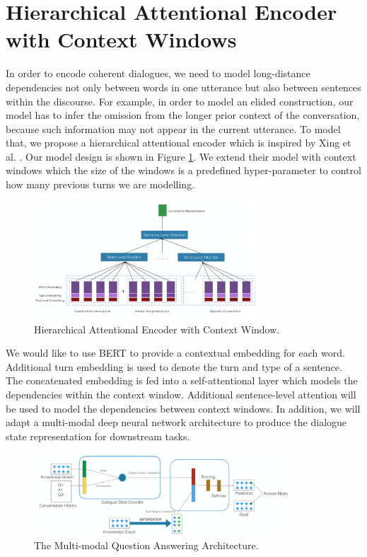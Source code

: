 \documentclass[bsc,frontabs,twoside,singlespacing,parskip,deptreport]{infthesis}     %
\begin{document}
\section{Hierarchical Attentional Encoder with Context Windows}

In order to encode coherent dialogues, we need to model long-distance dependencies not only between words in one utterance but also between sentences within the discourse. For example, in order to model an elided construction, our model has to infer the omission from the longer prior context of the conversation, because such information may not appear in the current utterance. To model that, we propose a hierarchical attentional encoder which is inspired by Xing et al. \cite{xing2018hierarchical}. Our model design is shown in Figure \ref{fig:modelwindows}. We extend their model with context windows which the size of the windows is a predefined hyper-parameter to control how many previous turns we are modelling. 


\begin{figure}[h]
    \centering
    \includegraphics[width=0.75\textwidth]{attemodel.png}
    \caption{Hierarchical Attentional Encoder with Context Window.}
    \label{fig:modelwindows}
\end{figure}

We would like to use BERT \cite{devlin2018bert} to provide a contextual embedding for each word. Additional turn embedding is used to denote the turn and type of a sentence. The concatenated embedding is fed into a self-attentional layer which models the dependencies within the context window. Additional sentence-level attention will be used to model the dependencies between context windows. In addition, we will adapt a multi-modal deep neural network architecture to produce the dialogue state representation for downstream tasks.

\begin{figure}[h]
    \centering
    \includegraphics[width=0.85\textwidth]{qa1pro.png}
    \caption{The Multi-modal Question Answering Architecture.}
    \label{fig:multimodal}
\end{figure}
\end{document}
